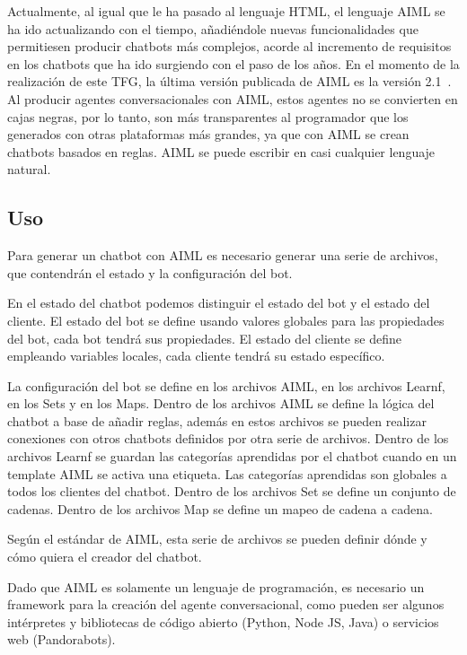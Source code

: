 Actualmente, al igual que le ha pasado al lenguaje HTML, el lenguaje AIML se ha ido actualizando con el tiempo, añadiéndole nuevas funcionalidades que permitiesen producir chatbots más complejos, acorde al incremento de requisitos en los chatbots que ha ido surgiendo con el paso de los años. En el momento de la realización de este TFG, la última versión publicada de AIML es la versión 2.1\ . Al producir agentes conversacionales con AIML, estos agentes no se convierten en cajas negras, por lo tanto, son más transparentes al programador que los generados con otras plataformas más grandes, ya que con AIML se crean chatbots basados en reglas. AIML se puede escribir en casi cualquier lenguaje natural.

\subsection*{Uso}

Para generar un chatbot con AIML es necesario generar una serie de archivos, que contendrán el estado y la configuración del bot.

En el estado del chatbot podemos distinguir el estado del bot y el estado del cliente. El estado del bot se define usando valores globales para las propiedades del bot, cada bot tendrá sus propiedades. El estado del cliente se define empleando variables locales, cada cliente tendrá su estado específico.

La configuración del bot se define en los archivos AIML, en los archivos Learnf, en los Sets y en los Maps. Dentro de los archivos AIML se define la lógica del chatbot a base de añadir reglas, además en estos archivos se pueden realizar conexiones con otros chatbots definidos por otra serie de archivos. Dentro de los archivos Learnf se guardan las categorías aprendidas por el chatbot cuando en un template AIML se activa una etiqueta. Las categorías aprendidas son globales a todos los clientes del chatbot. Dentro de los archivos Set se define un conjunto de cadenas. Dentro de los archivos Map se define un mapeo de cadena a cadena.

Según el estándar de AIML, esta serie de archivos se pueden definir dónde y cómo quiera el creador del chatbot.

Dado que AIML es solamente un lenguaje de programación, es necesario un \gls{framework} para la creación del agente conversacional, como pueden ser algunos intérpretes y bibliotecas de código abierto (Python, Node JS, Java) o servicios web (Pandorabots).


